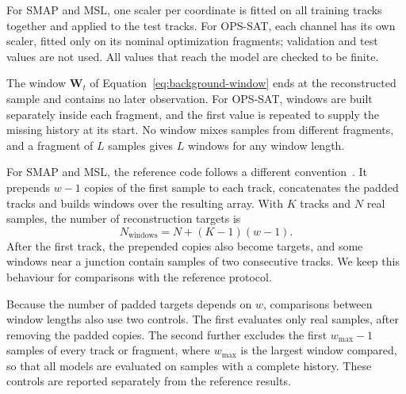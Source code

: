 For \ac{SMAP} and \ac{MSL}, one scaler per coordinate is fitted on all
training tracks together and applied to the test tracks. For \ac{OPS-SAT},
each channel has its own scaler, fitted only on its nominal optimization
fragments; validation and test values are not used. All values that reach
the model are checked to be finite.

The window \(\mathbf{W}_t\) of Equation~\eqref{eq:background-window} ends at
the reconstructed sample and contains no later observation. For
\ac{OPS-SAT}, windows are built separately inside each fragment, and the
first value is repeated to supply the missing history at its start. No
window mixes samples from different fragments, and a fragment of \(L\)
samples gives \(L\) windows for any window length.

For \ac{SMAP} and \ac{MSL}, the reference code follows a different
convention~\cite{TranADPlusReferenceCode}. It prepends \(w-1\) copies of the
first sample to each track, concatenates the padded tracks and builds windows
over the resulting array. With \(K\) tracks and \(N\) real samples, the
number of reconstruction targets is
\begin{equation}
  N_{\mathrm{windows}} = N+(K-1)(w-1).
  \label{eq:datasets-native-window-count}
\end{equation}
After the first track, the prepended copies also become targets, and some
windows near a junction contain samples of two consecutive tracks. We keep
this behaviour for comparisons with the reference protocol.

Because the number of padded targets depends on \(w\), comparisons between
window lengths also use two controls. The first evaluates only real samples,
after removing the padded copies. The second further excludes the first
\(w_{\max}-1\) samples of every track or fragment, where \(w_{\max}\) is the
largest window compared, so that all models are evaluated on samples with
a complete history. These controls are reported separately from the
reference results.

